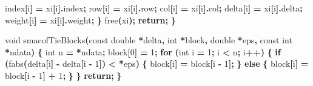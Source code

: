 \documentclass[
  12pt,
]{article}
\newenvironment{Shaded}{\begin{snugshade}}{\end{snugshade}}
\newcommand{\ControlFlowTok}[1]{\textcolor[rgb]{0.13,0.29,0.53}{\textbf{#1}}}
\newcommand{\DataTypeTok}[1]{\textcolor[rgb]{0.13,0.29,0.53}{#1}}
\newcommand{\DecValTok}[1]{\textcolor[rgb]{0.00,0.00,0.81}{#1}}
\newcommand{\NormalTok}[1]{#1}
\newcommand{\OperatorTok}[1]{\textcolor[rgb]{0.81,0.36,0.00}{\textbf{#1}}}
\begin{document}
\begin{Shaded}
\begin{Highlighting}[]
\NormalTok{        index}\OperatorTok{[}\NormalTok{i}\OperatorTok{]} \OperatorTok{=}\NormalTok{ xi}\OperatorTok{[}\NormalTok{i}\OperatorTok{].}\NormalTok{index}\OperatorTok{;}
\NormalTok{        row}\OperatorTok{[}\NormalTok{i}\OperatorTok{]} \OperatorTok{=}\NormalTok{ xi}\OperatorTok{[}\NormalTok{i}\OperatorTok{].}\NormalTok{row}\OperatorTok{;}
\NormalTok{        col}\OperatorTok{[}\NormalTok{i}\OperatorTok{]} \OperatorTok{=}\NormalTok{ xi}\OperatorTok{[}\NormalTok{i}\OperatorTok{].}\NormalTok{col}\OperatorTok{;}
\NormalTok{        delta}\OperatorTok{[}\NormalTok{i}\OperatorTok{]} \OperatorTok{=}\NormalTok{ xi}\OperatorTok{[}\NormalTok{i}\OperatorTok{].}\NormalTok{delta}\OperatorTok{;}
\NormalTok{        weight}\OperatorTok{[}\NormalTok{i}\OperatorTok{]} \OperatorTok{=}\NormalTok{ xi}\OperatorTok{[}\NormalTok{i}\OperatorTok{].}\NormalTok{weight}\OperatorTok{;}
    \OperatorTok{\}}
\NormalTok{    free}\OperatorTok{(}\NormalTok{xi}\OperatorTok{);}
    \ControlFlowTok{return}\OperatorTok{;}
\OperatorTok{\}}

\DataTypeTok{void}\NormalTok{ smacofTieBlocks}\OperatorTok{(}\DataTypeTok{const} \DataTypeTok{double} \OperatorTok{*}\NormalTok{delta}\OperatorTok{,} \DataTypeTok{int} \OperatorTok{*}\NormalTok{block}\OperatorTok{,} \DataTypeTok{double} \OperatorTok{*}\NormalTok{eps}\OperatorTok{,}
                     \DataTypeTok{const} \DataTypeTok{int} \OperatorTok{*}\NormalTok{ndata}\OperatorTok{)} \OperatorTok{\{}
    \DataTypeTok{int}\NormalTok{ n }\OperatorTok{=} \OperatorTok{*}\NormalTok{ndata}\OperatorTok{;}
\NormalTok{    block}\OperatorTok{[}\DecValTok{0}\OperatorTok{]} \OperatorTok{=} \DecValTok{1}\OperatorTok{;}
    \ControlFlowTok{for} \OperatorTok{(}\DataTypeTok{int}\NormalTok{ i }\OperatorTok{=} \DecValTok{1}\OperatorTok{;}\NormalTok{ i }\OperatorTok{\textless{}}\NormalTok{ n}\OperatorTok{;}\NormalTok{ i}\OperatorTok{++)} \OperatorTok{\{}
        \ControlFlowTok{if} \OperatorTok{(}\NormalTok{fabs}\OperatorTok{(}\NormalTok{delta}\OperatorTok{[}\NormalTok{i}\OperatorTok{]} \OperatorTok{{-}}\NormalTok{ delta}\OperatorTok{[}\NormalTok{i }\OperatorTok{{-}} \DecValTok{1}\OperatorTok{])} \OperatorTok{\textless{}} \OperatorTok{*}\NormalTok{eps}\OperatorTok{)} \OperatorTok{\{}
\NormalTok{            block}\OperatorTok{[}\NormalTok{i}\OperatorTok{]} \OperatorTok{=}\NormalTok{ block}\OperatorTok{[}\NormalTok{i }\OperatorTok{{-}} \DecValTok{1}\OperatorTok{];}
        \OperatorTok{\}} \ControlFlowTok{else} \OperatorTok{\{}
\NormalTok{            block}\OperatorTok{[}\NormalTok{i}\OperatorTok{]} \OperatorTok{=}\NormalTok{ block}\OperatorTok{[}\NormalTok{i }\OperatorTok{{-}} \DecValTok{1}\OperatorTok{]} \OperatorTok{+} \DecValTok{1}\OperatorTok{;}
        \OperatorTok{\}}
    \OperatorTok{\}}
    \ControlFlowTok{return}\OperatorTok{;}
\OperatorTok{\}}
\end{Highlighting}
\end{Shaded}
\end{document}
